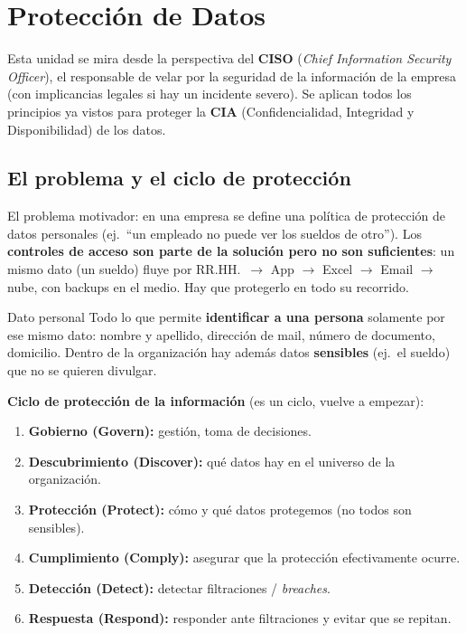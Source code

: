 \documentclass[../main.tex]{subfiles}
\begin{document}
\section{Protección de Datos}

Esta unidad se mira desde la perspectiva del \textbf{CISO} (\emph{Chief Information
Security Officer}), el responsable de velar por la seguridad de la información de la
empresa (con implicancias legales si hay un incidente severo). Se aplican todos los
principios ya vistos para proteger la \textbf{CIA} (Confidencialidad, Integridad y
Disponibilidad) de los datos.

\subsection{El problema y el ciclo de protección}

El problema motivador: en una empresa se define una política de protección de datos
personales (ej.\ ``un empleado no puede ver los sueldos de otro''). Los \textbf{controles
de acceso son parte de la solución pero no son suficientes}: un mismo dato (un sueldo)
fluye por RR.HH.\ $\to$ App $\to$ Excel $\to$ Email $\to$ nube, con backups en el medio.
Hay que protegerlo en todo su recorrido.

\begin{definicion}{Dato personal}
Todo lo que permite \textbf{identificar a una persona} solamente por ese mismo dato:
nombre y apellido, dirección de mail, número de documento, domicilio. Dentro de la
organización hay además datos \textbf{sensibles} (ej.\ el sueldo) que no se quieren
divulgar.
\end{definicion}

\textbf{Ciclo de protección de la información} (es un ciclo, vuelve a empezar):
\begin{enumerate}[nosep]
  \item \textbf{Gobierno (Govern):} gestión, toma de decisiones.
  \item \textbf{Descubrimiento (Discover):} qué datos hay en el universo de la organización.
  \item \textbf{Protección (Protect):} cómo y qué datos protegemos (no todos son sensibles).
  \item \textbf{Cumplimiento (Comply):} asegurar que la protección efectivamente ocurre.
  \item \textbf{Detección (Detect):} detectar filtraciones / \emph{breaches}.
  \item \textbf{Respuesta (Respond):} responder ante filtraciones y evitar que se repitan.
\end{enumerate}
\end{document}
